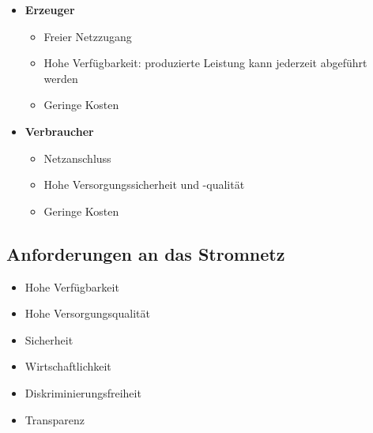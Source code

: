 \begin{itemize}
    \item \textbf{Erzeuger}
    \begin{itemize}
        \item Freier Netzzugang
        \item Hohe Verfügbarkeit: produzierte Leistung kann jederzeit abgeführt werden
        \item Geringe Kosten
    \end{itemize}
    \item \textbf{Verbraucher}
    \begin{itemize}
        \item Netzanschluss
        \item Hohe Versorgungssicherheit und -qualität
        \item Geringe Kosten
    \end{itemize}
\end{itemize}


\subsection{Anforderungen an das Stromnetz}

\begin{itemize}
    \item Hohe Verfügbarkeit
    \item Hohe Versorgungsqualität
    \item Sicherheit
    \item Wirtschaftlichkeit
    \item Diskriminierungsfreiheit
    \item Transparenz
\end{itemize}


